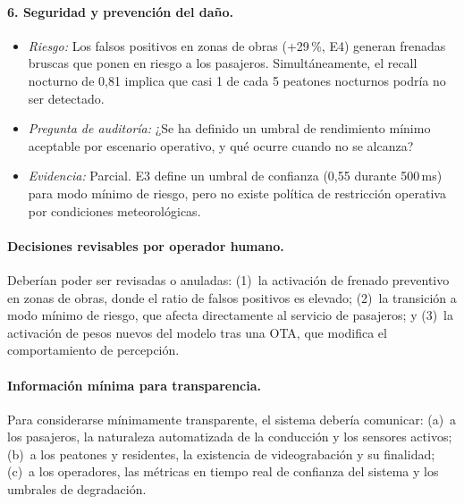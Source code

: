 \documentclass[11pt]{article}
\begin{document}
\paragraph{6. Seguridad y prevención del daño.}
\begin{itemize}[nosep]
    \item \textit{Riesgo:} Los falsos positivos en zonas de obras (+29\,\%, E4) generan frenadas bruscas que ponen en riesgo a los pasajeros. Simultáneamente, el recall nocturno de 0,81 implica que casi 1 de cada 5 peatones nocturnos podría no ser detectado.
    \item \textit{Pregunta de auditoría:} ¿Se ha definido un umbral de rendimiento mínimo aceptable por escenario operativo, y qué ocurre cuando no se alcanza?
    \item \textit{Evidencia:} Parcial. E3 define un umbral de confianza (0,55 durante 500\,ms) para modo mínimo de riesgo, pero no existe política de restricción operativa por condiciones meteorológicas.
\end{itemize}

\paragraph{Decisiones revisables por operador humano.} Deberían poder ser revisadas o anuladas: (1)~la activación de frenado preventivo en zonas de obras, donde el ratio de falsos positivos es elevado; (2)~la transición a modo mínimo de riesgo, que afecta directamente al servicio de pasajeros; y (3)~la activación de pesos nuevos del modelo tras una OTA, que modifica el comportamiento de percepción.

\paragraph{Información mínima para transparencia.} Para considerarse mínimamente transparente, el sistema debería comunicar: (a)~a los pasajeros, la naturaleza automatizada de la conducción y los sensores activos; (b)~a los peatones y residentes, la existencia de videograbación y su finalidad; (c)~a los operadores, las métricas en tiempo real de confianza del sistema y los umbrales de degradación.
\end{document}
